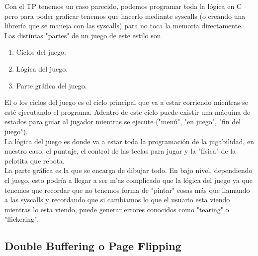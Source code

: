 \documentclass[]{article}
\begin{document}
Con el TP tenemos un caso parecido, podemos programar toda la l\'ogica en C pero para poder graficar tenemos que hacerlo mediante syscalls (o creando una librer\'ia que se maneja con las syscalls) para no toca la memoria directamente.\\

Las distintas "partes" de un juego de este estilo son
\begin{enumerate}
	\item Ciclos del juego.
	\item L\'ogica del juego.
	\item Parte gr\'afica del juego.
\end{enumerate}

El o los ciclos del juego es el ciclo principal que va a estar corriendo mientras se est\'e ejecutando el programa. Adentro de este ciclo puede existir una m\'aquina de estados para guiar al jugador mientras se ejecute ("men\'u", "en juego", "fin del juego").\\

La l\'ogica del juego es donde va a estar toda la programaci\'on de la jugabilidad, en nuestro caso, el puntaje, el control de las teclas para jugar y la "f\'isica" de la pelotita que rebota.\\

La parte gr\'afica es la que se encarga de dibujar todo. En bajo nivel, dependiendo el juego, esto podr\'ia a llegar a ser m'as complicado que la l\'ogica del juego ya que tenemos que recordar que no tenemos forma de "pintar" cosas m\'as que llamando a las syscalls y recordando que si cambiamos lo que el usuario esta viendo mientras lo esta viendo, puede generar errores conocidos como "tearing" o "flickering".

\subsection*{Double Buffering o Page Flipping}
\end{document}
